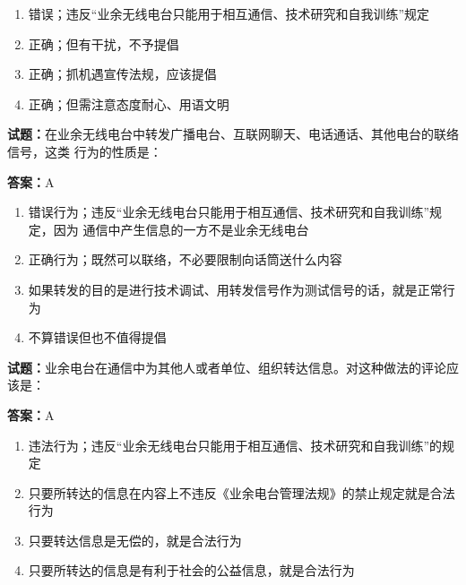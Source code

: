 \documentclass{ctexbook}
\begin{document}
\begin{enumerate}[leftmargin=3em]
  \item 错误；违反“业余无线电台只能用于相互通信、技术研究和自我训练”规定 

  \item 正确；但有干扰，不予提倡 

  \item 正确；抓机遇宣传法规，应该提倡 

  \item 正确；但需注意态度耐心、用语文明 

\end{enumerate}





\vspace{1em}

\textbf{试题：}在业余无线电台中转发广播电台、互联网聊天、电话通话、其他电台的联络信号，这类
行为的性质是： 

\textbf{答案：}A 

\begin{enumerate}[leftmargin=3em]
  \item 错误行为；违反“业余无线电台只能用于相互通信、技术研究和自我训练”规定，因为
通信中产生信息的一方不是业余无线电台 

  \item 正确行为；既然可以联络，不必要限制向话筒送什么内容 

  \item 如果转发的目的是进行技术调试、用转发信号作为测试信号的话，就是正常行为 

  \item 不算错误但也不值得提倡 

\end{enumerate}





\vspace{1em}

\textbf{试题：}业余电台在通信中为其他人或者单位、组织转达信息。对这种做法的评论应该是： 

\textbf{答案：}A 

\begin{enumerate}[leftmargin=3em]
  \item 违法行为；违反“业余无线电台只能用于相互通信、技术研究和自我训练”的规定 

  \item 只要所转达的信息在内容上不违反《业余电台管理法规》的禁止规定就是合法行为 

  \item 只要转达信息是无偿的，就是合法行为 

  \item 只要所转达的信息是有利于社会的公益信息，就是合法行为 

\end{enumerate}
\end{document}
